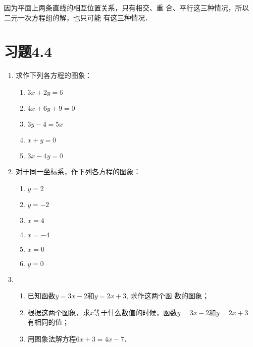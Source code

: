 因为平面上两条直线的相互位置关系，只有相交、重
合、平行这三种情况，所以二元一次方程组的解，也只可能
有这三种情况．

\section*{习题4.4}
\begin{enumerate}
    \item 
    求作下列各方程的图象：
\begin{multicols}{2}
\begin{enumerate}
    \item $3x+2y=6$
    \item $4x+6y+9=0$
    \item $3y-4=5x$
    \item $x+y=0$
    \item $3x-4y=0$
\end{enumerate}
\end{multicols}
 
 \item 对于同一坐标系，作下列各方程的图象：
 \begin{multicols}{2}
    \begin{enumerate}
        \item $y=2$
        \item $y=-2$
        \item $x=4$
        \item $x=-4$
        \item $x=0$
        \item $y=0$
    \end{enumerate}
    \end{multicols}
\item \begin{enumerate}
   \item 已知函数$y=3x-2$和$y=2x+3$, 求作这两个函
    数的图象；
    \item 根据这两个图象，求$x$等于什么数值的时候，函数$y=3x-2$和$y=2x+3$有相同的值；
    \item 用图象法解方程$6x+3=4x-7$． 
\end{enumerate}


\end{enumerate}
